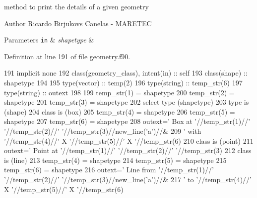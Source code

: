 method to print the details of a given geometry 

\begin{DoxyAuthor}{Author}
Ricardo Birjukovs Canelas -\/ M\+A\+R\+E\+T\+EC
\end{DoxyAuthor}

\begin{DoxyParams}[1]{Parameters}
\mbox{\tt in}  & {\em shapetype} & \\
\hline
\end{DoxyParams}


Definition at line 191 of file geometry.\+f90.


\begin{DoxyCode}
191     \textcolor{keywordtype}{implicit none}
192     \textcolor{keywordtype}{class}(geometry\_class), \textcolor{keywordtype}{intent(in)} :: self
193     \textcolor{keywordtype}{class}(shape) :: shapetype
194     
195     \textcolor{keywordtype}{type}(vector) :: temp(2)
196     \textcolor{keywordtype}{type}(string) :: temp\_str(6)
197     \textcolor{keywordtype}{type}(string) :: outext
198 
199     temp\_str(1) = shapetype%
200     temp\_str(2) = shapetype%
201     temp\_str(3) = shapetype%
202     \textcolor{keywordflow}{select type} (shapetype)
203 \textcolor{keywordflow}{    type is} (shape)
204 \textcolor{keywordflow}{    class is} (box)
205         temp\_str(4) = shapetype%
206         temp\_str(5) = shapetype%
207         temp\_str(6) = shapetype%
208         outext=\textcolor{stringliteral}{'      Box at '}//temp\_str(1)//\textcolor{stringliteral}{' '}//temp\_str(2)//\textcolor{stringliteral}{' '}//temp\_str(3)//new\_line(\textcolor{stringliteral}{'a'})//&
209                \textcolor{stringliteral}{'       with '}//temp\_str(4)//\textcolor{stringliteral}{' X '}//temp\_str(5)//\textcolor{stringliteral}{' X '}//temp\_str(6)      
210 \textcolor{keywordflow}{    class is} (point)
211         outext=\textcolor{stringliteral}{'      Point at '}//temp\_str(1)//\textcolor{stringliteral}{' '}//temp\_str(2)//\textcolor{stringliteral}{' '}//temp\_str(3)
212 \textcolor{keywordflow}{    class is} (line)
213         temp\_str(4) = shapetype%
214         temp\_str(5) = shapetype%
215         temp\_str(6) = shapetype%
216         outext=\textcolor{stringliteral}{'      Line from '}//temp\_str(1)//\textcolor{stringliteral}{' '}//temp\_str(2)//\textcolor{stringliteral}{' '}//temp\_str(3)//new\_line(\textcolor{stringliteral}{'a'})//&
217                \textcolor{stringliteral}{'       to '}//temp\_str(4)//\textcolor{stringliteral}{' X '}//temp\_str(5)//\textcolor{stringliteral}{' X '}//temp\_str(6)

\end{DoxyCode}
